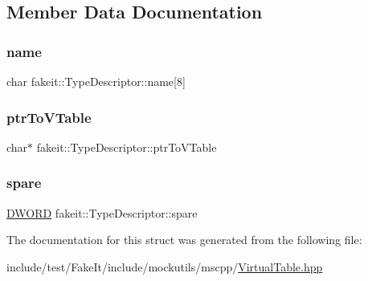 \subsection{Member Data Documentation}
\mbox{\label{structfakeit_1_1TypeDescriptor_a8f75f4fe227fc84b70edf2bd5f08e757}} 
\subsubsection{\texorpdfstring{name}{name}}
{\footnotesize\ttfamily char fakeit\+::\+Type\+Descriptor\+::name\mbox{[}8\mbox{]}}

\mbox{\label{structfakeit_1_1TypeDescriptor_a06d363f2d70e40100beff0c23aa49443}} 
\subsubsection{\texorpdfstring{ptrToVTable}{ptrToVTable}}
{\footnotesize\ttfamily char$\ast$ fakeit\+::\+Type\+Descriptor\+::ptr\+To\+V\+Table}

\mbox{\label{structfakeit_1_1TypeDescriptor_abb3213f6224021d1027eea1e073012e7}} 
\subsubsection{\texorpdfstring{spare}{spare}}
{\footnotesize\ttfamily \mbox{\hyperlink{namespacefakeit_a3d9fcff73186d3a22472ec6156db1f10}{D\+W\+O\+RD}} fakeit\+::\+Type\+Descriptor\+::spare}



The documentation for this struct was generated from the following file\+:\begin{DoxyCompactItemize}
\item 
include/test/\+Fake\+It/include/mockutils/mscpp/\mbox{\hyperlink{mscpp_2VirtualTable_8hpp}{Virtual\+Table.\+hpp}}\end{DoxyCompactItemize}
